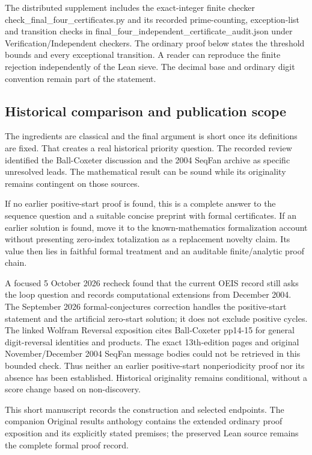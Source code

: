 \documentclass[11pt,a4paper]{article}
\begin{document}
The distributed supplement includes the exact-integer finite checker check\_final\_four\_certificates.py and its recorded prime-counting, exception-list and transition checks in final\_four\_independent\_certificate\_audit.json under Verification/Independent checkers. The ordinary proof below states the threshold bounds and every exceptional transition. A reader can reproduce the finite rejection independently of the Lean sieve. The decimal base and ordinary digit convention remain part of the statement.

\subsection{Historical comparison and publication scope}
The ingredients are classical and the final argument is short once its definitions are fixed. That creates a real historical priority question. The recorded review identified the Ball-Coxeter discussion and the 2004 SeqFan archive as specific unresolved leads. The mathematical result can be sound while its originality remains contingent on those sources.

If no earlier positive-start proof is found, this is a complete answer to the sequence question and a suitable concise preprint with formal certificates. If an earlier solution is found, move it to the known-mathematics formalization account without presenting zero-index totalization as a replacement novelty claim. Its value then lies in faithful formal treatment and an auditable finite/analytic proof chain.

A focused 5 October 2026 recheck found that the current OEIS record still asks the loop question and records computational extensions from December 2004. The September 2026 formal-conjectures correction handles the positive-start statement and the artificial zero-start solution; it does not exclude positive cycles. The linked Wolfram Reversal exposition cites Ball-Coxeter pp14-15 for general digit-reversal identities and products. The exact 13th-edition pages and original November/December 2004 SeqFan message bodies could not be retrieved in this bounded check. Thus neither an earlier positive-start nonperiodicity proof nor its absence has been established. Historical originality remains conditional, without a score change based on non-discovery.

{\small This short manuscript records the construction and selected endpoints. The companion Original results anthology contains the extended ordinary proof exposition and its explicitly stated premises; the preserved Lean source remains the complete formal proof record.\par}
\end{document}
